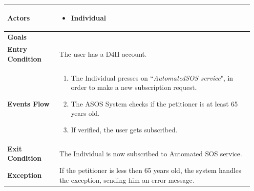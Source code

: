             \begin{table}[H]
            	\centering
                
                \begin{tabular}{|p{3cm}|p{8.2cm}|}
                    \hline
                    \textbf{Actors} & \begin{itemize}
                        \item Individual
                    \end{itemize} \\
                     \hline
                    \textbf{Goals} & \\ 
                     \hline
                    \textbf{Entry Condition} & The user has a D4H account. \\
                     \hline
                    \textbf{Events Flow} & \begin{enumerate}
                                               \item The Individual presses on
                                               ``\emph{AutomatedSOS service}", in order to make a new subscription request.
                                               \item The ASOS System checks if the petitioner is at least 65 years old.
                                               \item If verified, the user gets subscribed.
                                           \end{enumerate}\\
                     \hline
                    \textbf{Exit Condition} & The Individual is now subscribed to Automated SOS service.\\
                     \hline
                    \textbf{Exception} & If the petitioner is less then 65 years old, the system handles the exception, sending him an error message. \\
                     \hline
                \end{tabular}  
            \end{table} 
            
